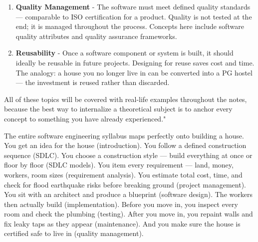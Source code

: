 \documentclass{report}
\begin{document}
\begin{enumerate}
    \item \textbf{Quality Management} - The software must meet defined quality standards — comparable to ISO certification for a product. Quality is not tested at the end; it is managed throughout the process. Concepts here include software quality attributes and quality assurance frameworks.

    \item \textbf{Reusability} - Once a software component or system is built, it should ideally be reusable in future projects. Designing for reuse saves cost and time. The analogy: a house you no longer live in can be converted into a PG hostel — the investment is reused rather than discarded.
\end{enumerate}
All of these topics will be covered with real-life examples throughout the notes, because the best way to internalize a theoretical subject is to anchor every concept to something you have already experienced."

\begin{real}
    The entire software engineering syllabus maps perfectly onto building a house. You get an idea for the house (introduction). You follow a defined construction sequence (SDLC). You choose a construction style — build everything at once or floor by floor (SDLC models). You item every requirement — land, money, workers, room sizes (requirement analysis). You estimate total cost, time, and check for flood earthquake risks before breaking ground (project management). You sit with an architect and produce a blueprint (software design). The workers then actually build (implementation). Before you move in, you inspect every room and check the plumbing (testing). After you move in, you repaint walls and fix leaky taps as they appear (maintenance). And you make sure the house is certified safe to live in (quality management).
\end{real}
\end{document}
